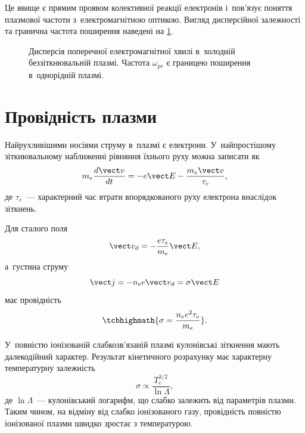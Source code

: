 Це явище є прямим проявом колективної реакції електронів і~пов'язує поняття плазмової частоти з~електромагнітною оптикою. Вигляд дисперсійної залежності та гранична частота поширення наведені на \ref{fig:plasma-dispersion}.

\begin{figure}[htbp]\centering
	\caption{Дисперсія поперечної електромагнітної хвилі в~холодній беззіткнювальній плазмі. Частота $\omega_{pe}$ є границею поширення в~однорідній плазмі.}\label{fig:plasma-dispersion}
\end{figure}



\section{Провідність плазми}



Найрухливішими носіями струму в~плазмі є електрони. У~найпростішому зіткнювальному наближенні рівняння їхнього руху можна записати як
\begin{equation}
	m_e\frac{d\vect v}{dt}
	=-e\vect E-\frac{m_e\vect v}{\tau_e},
\end{equation}
де $\tau_e$~--- характерний час втрати впорядкованого руху електрона внаслідок зіткнень.

Для сталого поля
\begin{equation*}
	\vect v_d=-\frac{e\tau_e}{m_e}\vect E,
\end{equation*}
а~густина струму
\begin{equation}
	\vect j=-n_e e\vect v_d
	=\sigma\vect E
\end{equation}
має провідність
\begin{equation}
	\tcbhighmath{\sigma=\frac{n_e e^2\tau_e}{m_e}}.
\end{equation}

У~повністю іонізованій слабкозв'язаній плазмі кулонівські зіткнення мають далекодійний характер. Результат кінетичного розрахунку має характерну температурну залежність
\begin{equation}
	\sigma\propto
	\frac{T_e^{3/2}}{\ln\Lambda},
\end{equation}
де $\ln\Lambda$~--- кулонівський логарифм, що слабко залежить від параметрів плазми. Таким чином, на відміну від слабко іонізованого газу, провідність повністю іонізованої плазми швидко зростає з температурою.


